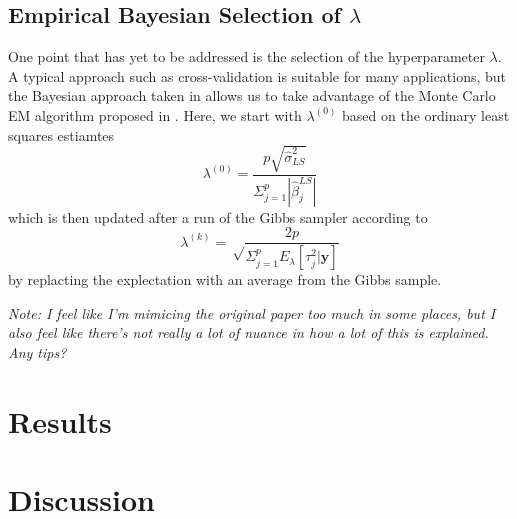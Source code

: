 \documentclass{uwstat572}
\begin{document}
\subsection{Empirical Bayesian Selection of $\lambda$}
One point that has yet to be addressed is the selection of the hyperparameter $\lambda$. A typical approach such as cross-validation is suitable for many applications, but the Bayesian approach taken in \cite{park2008bayesian} allows us to take advantage of the Monte Carlo EM algorithm proposed in \cite{casella2001empirical}. Here, we start with $\lambda^{(0)}$ based on the ordinary least squares estiamtes \[ 
\lambda^{(0)}=\frac{p\sqrt{\hat\sigma^2_{LS}}}{\Sigma^p_{j=1}|\hat\beta_j^{LS}|} 
\] which is then updated after a run of the Gibbs sampler according to \[ 
\lambda^{(k)}=\sqrt\frac{2p}{\Sigma^p_{j=1}E_\lambda[\tau^2_j|\mathbf{y}]}
\] by replacting the explectation with an average from the Gibbs sample. 

\emph{Note: I feel like I'm mimicing the original paper too much in some places, but I also feel like there's not really a lot of nuance in how a lot of this is explained. Any tips?}

\section{Results}

\section{Discussion}


\end{document}
